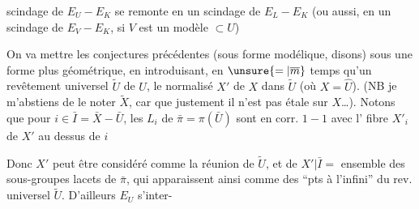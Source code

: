 scindage de $E_U-E_K$ se remonte en un scindage de $E_L-E_K$ (ou aussi,  en un scindage de $E_V-E_K$, si $V$ est un modèle $\subset U$)

On va mettre les conjectures précédentes (sous forme modélique, disons) sous une forme plus géométrique, en introduisant, en $\unsure{=|\overline m}$ temps qu'un revêtement universel  $\widetilde U$ de $U$, le normalisé  $X'$ de $X$ dans $\widetilde U$ (où $X=\widehat U$). (NB je m'abstiens de le noter $\widetilde X$, car que justement il n'est pas étale sur $X$\ldots). Notons que pour $i\in\bar I=\bar X-\bar U$, les  $L_i$ de $\bar\pi=\pi(\bar U)$ sont en corr. $1-1$ avec l' fibre $X'_i$ de $X'$ au dessus de $i$


Donc $X'$ peut être considéré comme la réunion de $\widetilde U$, et de $X'|\bar I=$ ensemble des sous-groupes lacets de $\bar\pi$, qui apparaissent ainsi comme des ``pts à l'infini'' du rev. universel $\widetilde U$. D'ailleurs $E_U$ s'inter-
